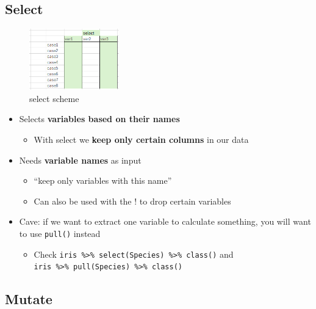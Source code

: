\documentclass[
]{book}
\providecommand{\tightlist}{%
  \setlength{\itemsep}{0pt}\setlength{\parskip}{0pt}}
\begin{document}
\subsection{Select}\label{select}

\begin{figure}
\centering
\includegraphics[width=\textwidth,height=1.04167in]{./img/select.png}
\caption{select scheme}
\end{figure}

\begin{itemize}
\tightlist
\item
  Selects \textbf{variables based on their names}

  \begin{itemize}
  \tightlist
  \item
    With select we \textbf{keep only certain columns} in our data
  \end{itemize}
\item
  Needs \textbf{variable names} as input

  \begin{itemize}
  \tightlist
  \item
    ``keep only variables with this name''
  \item
    Can also be used with the ! to drop certain variables
  \end{itemize}
\item
  Cave: if we want to extract one variable to calculate something, you will want to use \texttt{pull()} instead

  \begin{itemize}
  \tightlist
  \item
    Check \texttt{iris\ \%\textgreater{}\%\ select(Species)\ \%\textgreater{}\%\ class()} and \texttt{iris\ \%\textgreater{}\%\ pull(Species)\ \%\textgreater{}\%\ class()}
  \end{itemize}
\end{itemize}

\subsection{Mutate}\label{mutate}
\end{document}
